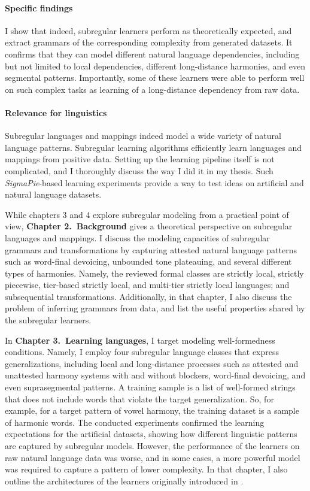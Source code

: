 \paragraph{Specific findings}
I show that indeed, subregular learners perform as theoretically expected, and extract grammars of the corresponding complexity from generated datasets.
It confirms that they can model different natural language dependencies, including but not limited to local dependencies, different long-distance harmonies, and even segmental patterns.
Importantly, some of these learners were able to perform well on such complex tasks as learning of a long-distance dependency from raw data.

\paragraph{Relevance for linguistics}
Subregular languages and mappings indeed model a wide variety of natural language patterns.
Subregular learning algorithms efficiently learn languages and mappings from positive data.
Setting up the learning pipeline itself is not complicated, and I thoroughly discuss the way I did it in my thesis.
Such \emph{SigmaPie}-based learning experiments provide a way to test ideas on artificial and natural language datasets.
\medskip


While chapters 3 and 4 explore subregular modeling from a practical point of view, \textbf{Chapter 2.\ Background} gives a theoretical perspective on subregular languages and mappings.
I discuss the modeling capacities of subregular grammars and transformations by capturing attested natural language patterns such as word-final devoicing, unbounded tone plateauing, and several different types of harmonies.
Namely, the reviewed formal classes are strictly local, strictly piecewise, tier-based strictly local, and multi-tier strictly local languages; and subsequential transformations.
Additionally, in that chapter, I also discuss the problem of inferring grammars from data, and list the useful properties shared by the subregular learners.



In \textbf{Chapter 3.\ Learning languages}, I target modeling well-formedness conditions.
Namely, I employ four subregular language classes that express generalizations, including local and long-distance processes such as attested and unattested harmony systems with and without blockers, word-final devoicing, and even suprasegmental patterns.
A training sample is a list of well-formed strings that does not include words that violate the target generalization.
So, for example, for a target pattern of vowel harmony, the training dataset is a sample of harmonic words.
The conducted experiments confirmed the learning expectations for the artificial datasets, showing how different linguistic patterns are captured by subregular models.
However, the performance of the learners on raw natural language data was worse, and in some cases, a more powerful model was required to capture a pattern of lower complexity.
In that chapter, I also outline the architectures of the learners originally introduced in \citep{Heinz-2010-SEL,JardineMcMullin2017,McMullinAksenovaDeSanto2019}.


